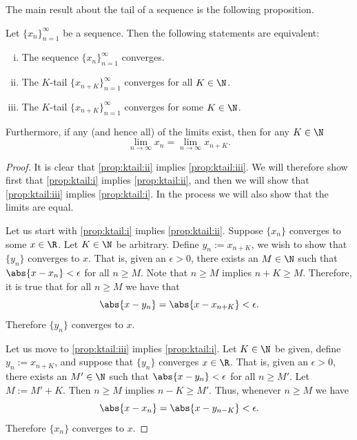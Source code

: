 \documentclass[12pt]{book}
\begin{document}
The main result about the tail of a sequence is the following proposition.

\begin{prop}
Let $\{ x_n \}_{n=1}^\infty$ be a sequence.
Then the following
statements are equivalent:
\begin{enumerate}[(i)]
\item \label{prop:ktail:i}
The sequence $\{ x_n \}_{n=1}^\infty$ converges.
\item \label{prop:ktail:ii}
The $K$-tail $\{ x_{n+K} \}_{n=1}^\infty$ converges for all $K \in \N$.
\item \label{prop:ktail:iii}
The $K$-tail $\{ x_{n+K} \}_{n=1}^\infty$ converges for some $K \in \N$.
\end{enumerate}
Furthermore, if any (and hence all) of the limits exist, then for any $K \in \N$
\begin{equation*}
\lim_{n\to \infty} x_n = \lim_{n \to \infty} x_{n+K} .
\end{equation*}
\end{prop}

\begin{proof}
It is clear that
\ref{prop:ktail:ii} implies \ref{prop:ktail:iii}.
We will therefore show first that
\ref{prop:ktail:i}
implies
\ref{prop:ktail:ii},
and then we will show that
\ref{prop:ktail:iii}
implies
\ref{prop:ktail:i}.
In the process we will also show that the limits are equal.

Let us start with \ref{prop:ktail:i} implies \ref{prop:ktail:ii}.
Suppose $\{x_n \}$ converges to some $x \in \R$.
Let $K \in \N$ be arbitrary.
Define $y_n := x_{n+K}$, we wish to show that $\{ y_n \}$ converges
to $x$.
That is, given an $\epsilon > 0$, there exists an $M \in \N$ such that
$\abs{x-x_n} < \epsilon$ for all $n \geq M$.
Note that $n \geq M$ implies $n+K \geq M$.
Therefore, it is true that for
all $n \geq M$ we have that 
\begin{equation*}
\abs{x-y_n} = \abs{x-x_{n+K}} < \epsilon .
\end{equation*}
Therefore $\{ y_n \}$ converges to $x$.

Let us move to \ref{prop:ktail:iii} implies \ref{prop:ktail:i}.
Let $K \in \N$ be given, define
$y_n := x_{n+K}$, and suppose that $\{ y_n \}$ converges $x \in \R$.
That is, given an $\epsilon > 0$, there exists an $M' \in \N$ such that
$\abs{x-y_n} < \epsilon$ for all $n \geq M'$.
Let $M := M'+K$.
Then $n \geq M$ implies $n-K \geq M'$.
Thus, whenever $n \geq M$ we have
\begin{equation*}
\abs{x-x_n} = \abs{x-y_{n-K}} < \epsilon.
\end{equation*}
Therefore $\{ x_n \}$ converges to $x$.
\end{proof}
\end{document}

